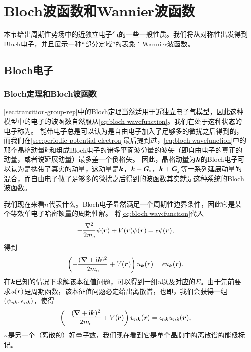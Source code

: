 \section{Bloch波函数和Wannier波函数}

本节给出周期性势场中的近独立电子气的一些一般性质。我们将从对称性出发得到Bloch电子，并且展示一种“部分定域”的表象：Wannier波函数。

\subsection{Bloch电子}\label{sec:bloch-electron}

\subsubsection{Bloch定理和Bloch波函数}

\autoref{sec:transition-group-rep}中的Bloch定理当然适用于近独立电子气模型，因此这种模型中的电子的波函数自然服从\eqref{eq:bloch-wavefunction}。我们在处于这种状态的电子称为。
能带电子总是可以认为是自由电子加入了足够多的微扰之后得到的，而我们在\autoref{sec:periodic-potential-electron}最后提到过，\eqref{eq:bloch-wavefunction}中的那个晶格动量$\vb*{k}$和组成Bloch电子的诸多平面波分量的波矢（即自由电子的真正的动量，或者说延展动量）最多差一个倒格矢。
因此，晶格动量为$\vb*{k}$的Bloch电子可以认为是携带了真实的动量，这动量是$\vb*{k}$，$\vb*{k}+\vb*{G}_i$，$\vb*{k} + \vb*{G}_j$等一系列延展动量的混合，而自由电子做了足够多的微扰之后得到的波函数其实就是这种系统的Bloch波函数。

我们现在来看$n$代表什么。Bloch电子显然满足一个周期性边界条件，因此它是某个等效单电子哈密顿量的周期性解。
将\eqref{eq:bloch-wavefunction}代入
\[
    -\frac{\laplacian}{2m_\text{e}} \psi(\vb*{r}) + V(\vb*{r}) \psi(\vb*{r}) = \epsilon \psi(\vb*{r}),
\]
得到
\begin{equation}
    \left( - \frac{(\grad+ \mathrm{i} \vb*{k})^2}{2m_\text{e}} + V(\vb*{r}) \right) u_{\vb*{k}}(\vb*{r}) = \epsilon u_{\vb*{k}}(\vb*{r}).
    \label{eq:block-energy-problem}
\end{equation}
在$\vb*{k}$已知的情况下求解该本征值问题，可以得到一组$u$以及对应的$E$。由于先前要求$u(\vb*{r})$是周期函数，该本征值问题必定给出离散谱，也即，我们会获得一组$(\psi_{n \vb*{k}}, \epsilon_{n \vb*{k}})$，使得
\begin{equation}
    \left( - \frac{(\grad+\mathrm{i} \vb*{k})^2}{2m_\text{e}} + V(\vb*{r}) \right) u_{n \vb*{k}}(\vb*{r}) = \epsilon_{n \vb*{k}} u_{n \vb*{k}}(\vb*{r}),
    \label{eq:eigen-function-bloch-u}
\end{equation}
$n$是另一个（离散的）好量子数，我们现在看到它是单个晶胞中的离散谱的能级标记。

